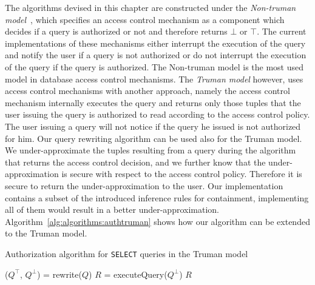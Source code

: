 The algorithms devised in this chapter are constructed under the \emph{Non-truman model}~\cite{rizvi2004extending}, which specifies an access control mechanism as a component which decides if a query is authorized or not and therefore returns $\bot$ or $\top$.
%
The current implementations of these mechanisms either interrupt the execution of the query and notify the user if a query is not authorized or do not interrupt the execution of the query if the query is authorized.
%
The Non-truman model is the most used model in database access control mechanisms.
%
The \emph{Truman model} however, uses access control mechanisms with another approach, namely the access control mechanism internally executes the query and returns only those tuples that the user issuing the query is authorized to read according to the access control policy.
%
The user issuing a query will not notice if the query he issued is not authorized for him.
%
Our query rewriting algorithm can be used also for the Truman model.
%
We under-approximate the tuples resulting from a query during the algorithm that returns the access control decision, and we further know that the under-approximation is secure with respect to the access control policy.
%
Therefore it is secure to return the under-approximation to the user.
%
Our implementation contains a subset of the introduced inference rules for containment, implementing all of them would result in a better under-approximation.
%
Algorithm~\ref{alg:algorithms:authtruman} shows how our algorithm can be extended to the Truman model.
%
\begin{algorithm}
\caption{Authorization algorithm for \texttt{SELECT} queries in the Truman model}
\label{alg:algorithms:authtruman}
	\SetAlgoLined
	($Q^\top$, $Q^\bot$) = rewrite($Q$)\;
	$R$ = executeQuery($Q^\bot$)\;
	\Return $R$

\end{algorithm}
